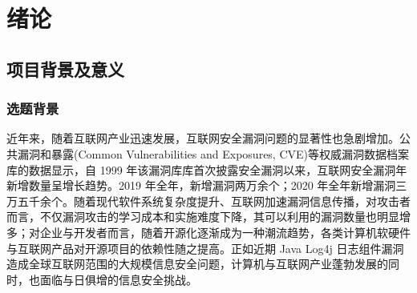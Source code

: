 \documentclass[a4paper,AutoFakeBold,oneside,12pt]{book}
\begin{document}
\blankmatter


\blankmatter


\blankmatter


\blankmatter


\frontmatter\tableofcontents %


\newpage\mainmatter
{}


\chapter{绪论}

\section{项目背景及意义}

\subsection{选题背景}

近年来，随着互联网产业迅速发展，互联网安全漏洞问题的显著性也急剧增加。公共漏洞和暴露(Common Vulnerabilities and Exposures, CVE)等权威漏洞数据档案库的数据显示，自 1999 年该漏洞库库首次披露安全漏洞以来，互联网安全漏洞年新增数量呈增长趋势。2019 年全年，新增漏洞两万余个；2020 年全年新增漏洞三万五千余个。随着现代软件系统复杂度提升、互联网加速漏洞信息传播，对攻击者而言，不仅漏洞攻击的学习成本和实施难度下降，其可以利用的漏洞数量也明显增多；对企业与开发者而言，随着开源化逐渐成为一种潮流趋势，各类计算机软硬件与互联网产品对开源项目的依赖性随之提高。正如近期 Java Log4j 日志组件漏洞造成全球互联网范围的大规模信息安全问题，计算机与互联网产业蓬勃发展的同时，也面临与日俱增的信息安全挑战。
\end{document}
